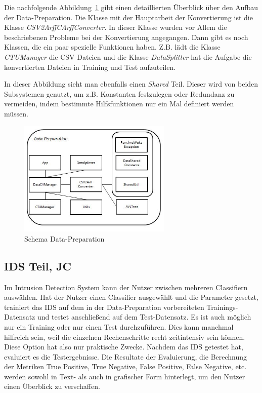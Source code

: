 \documentclass[main.tex]{subfiles}
\begin{document}
Die nachfolgende Abbildung~\ref{fig:schema_data_preparation} gibt einen detaillierten Überblick über den Aufbau der Data-Preparation.
Die Klasse mit der Hauptarbeit der Konvertierung ist die Klasse
\textit{CSV2ArffCArffConverter}.
In dieser Klasse wurden vor Allem die beschriebenen Probleme bei der
Konvertierung angegangen.
Dann gibt es noch Klassen, die ein paar spezielle Funktionen haben. Z.B. lädt
die Klasse \textit{CTUManager} die CSV Dateien und die Klasse
\textit{DataSplitter} hat die Aufgabe die konvertierten Dateien in Training und
Test aufzuteilen.

In dieser Abbildung sieht man ebenfalls einen \textit{Shared} Teil.
Dieser wird von beiden Subsystemen genutzt, um z.B. Konstanten festzulegen oder
Redundanz zu vermeiden, indem bestimmte Hilfsfunktionen nur ein Mal definiert
werden müssen.

\begin{figure}[ht]
 \centering
 \includegraphics[width=0.65\textwidth]{images/Schema_Data_Preparation.jpg}
 \caption{Schema Data-Preparation}
 \label{fig:schema_data_preparation}
\end{figure}


\subsection{IDS Teil, JC} \label{subsec:VorgehenIDS}

Im Intrusion Detection System kann der Nutzer zwischen mehreren Classifiern auswählen.
Hat der Nutzer einen Classifier ausgewählt und die Parameter gesetzt, trainiert das IDS auf dem in der Data-Preparation vorbereiteten Trainings-Datensatz und testet anschließend auf dem Test-Datensatz.
Es ist auch möglich nur ein Training oder nur einen Test durchzuführen.
Dies kann manchmal hilfreich sein, weil die einzelnen Rechenschritte recht
zeitintensiv sein können.
Diese Option hat also nur praktische Zwecke.
Nachdem das IDS getestet hat, evaluiert es die Testergebnisse.
Die Resultate der Evaluierung, die Berechnung der Metriken True Positive, True
Negative, False Positive, False Negative, etc. werden sowohl in Text- als auch in
grafischer Form hinterlegt, um den Nutzer einen Überblick zu verschaffen.
\end{document}
